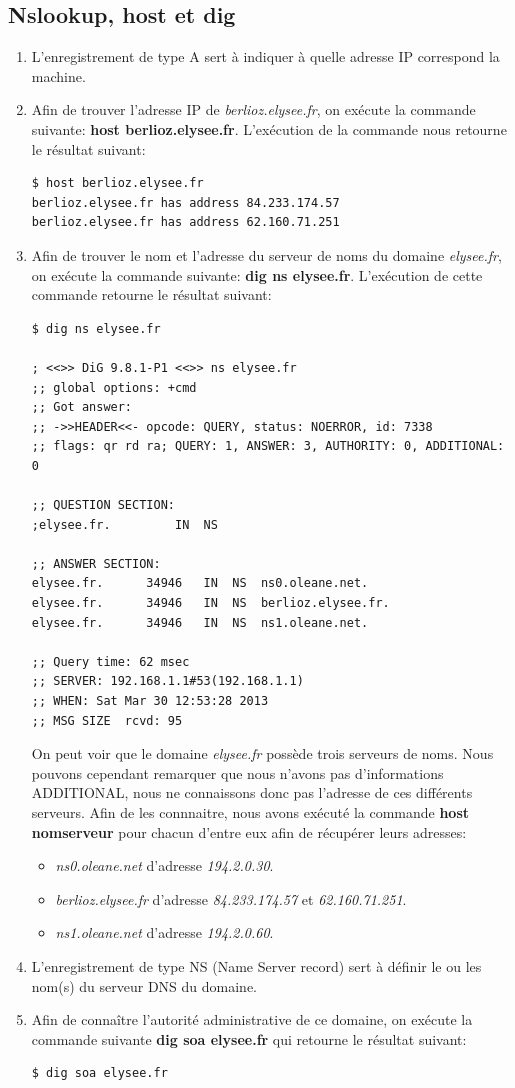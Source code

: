 \documentclass[a4paper,10pt]{article}
\begin{document}
\subsection{Nslookup, host et dig}
\begin{enumerate}
\item L'enregistrement de type A sert à indiquer à quelle adresse IP correspond la machine.
\item Afin de trouver l'adresse IP de \textit{berlioz.elysee.fr}, on exécute la commande suivante: \textbf{host berlioz.elysee.fr}. L'exécution de la commande nous retourne le résultat suivant:
\begin{verbatim}
$ host berlioz.elysee.fr
berlioz.elysee.fr has address 84.233.174.57
berlioz.elysee.fr has address 62.160.71.251
\end{verbatim}
\item{Afin de trouver le nom et l'adresse du serveur de noms du domaine \textit{elysee.fr}, on exécute la commande suivante: \textbf{dig ns elysee.fr}. L'exécution de cette commande retourne le résultat suivant:
\begin{verbatim}
$ dig ns elysee.fr

; <<>> DiG 9.8.1-P1 <<>> ns elysee.fr
;; global options: +cmd
;; Got answer:
;; ->>HEADER<<- opcode: QUERY, status: NOERROR, id: 7338
;; flags: qr rd ra; QUERY: 1, ANSWER: 3, AUTHORITY: 0, ADDITIONAL: 0

;; QUESTION SECTION:
;elysee.fr.			IN	NS

;; ANSWER SECTION:
elysee.fr.		34946	IN	NS	ns0.oleane.net.
elysee.fr.		34946	IN	NS	berlioz.elysee.fr.
elysee.fr.		34946	IN	NS	ns1.oleane.net.

;; Query time: 62 msec
;; SERVER: 192.168.1.1#53(192.168.1.1)
;; WHEN: Sat Mar 30 12:53:28 2013
;; MSG SIZE  rcvd: 95
\end{verbatim}
On peut voir que le domaine \textit{elysee.fr} possède trois serveurs de noms. Nous pouvons cependant remarquer que nous n'avons pas d'informations ADDITIONAL, nous ne connaissons donc pas l'adresse de ces différents serveurs. Afin de les connnaitre, nous avons exécuté la commande \textbf{host nomserveur} pour chacun d'entre eux afin de récupérer leurs adresses:
\begin{itemize}
\item \textit{ns0.oleane.net} d'adresse \textit{194.2.0.30}.
\item \textit{berlioz.elysee.fr} d'adresse \textit{84.233.174.57} et \textit{62.160.71.251}.
\item \textit{ns1.oleane.net} d'adresse \textit{194.2.0.60}.
\end{itemize}
}
\item L'enregistrement de type NS (Name Server record) sert à définir le ou les nom(s) du serveur DNS du domaine.
\item Afin de connaître l'autorité administrative de ce domaine, on exécute la commande suivante \textbf{dig soa elysee.fr} qui retourne le résultat suivant:
\begin{verbatim}
$ dig soa elysee.fr


\end{verbatim}
\end{enumerate}
\end{document}
